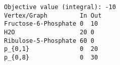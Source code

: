 \begin{verbatim}
Objective value (integral): -10
Vertex/Graph         In Out 
Fructose-6-Phosphate 0  10  
H2O                  20 0   
Ribulose-5-Phosphate 60 0   
p_{0,1}              0  20  
p_{0,8}              0  30  
\end{verbatim}
